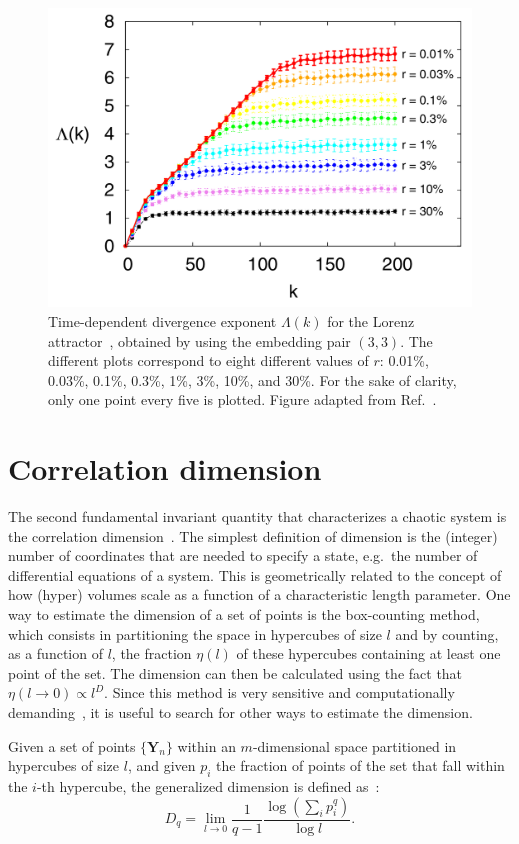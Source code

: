 \begin{figure}[!htbp]
\centering
\includegraphics[width=.6\linewidth]{images/lorenz_divergence.png}
\caption{
    Time-dependent divergence exponent $\Lambda(k)$ for the Lorenz attractor~\cite{lorenz1963deterministic},
    obtained by using the embedding pair
    $(3,3)$. The different plots correspond to eight different values of $r$:
    0.01\%, 0.03\%, 0.1\%, 0.3\%, 1\%, 3\%, 10\%, and 30\%. For the sake of
    clarity, only one point every five is plotted.
    Figure adapted from Ref.~\cite{ref:franchi2014statistical}.
}\label{fig: lorenz divergence}
\end{figure}


\section{Correlation dimension}\label{sec: correlation dimension}

The second fundamental invariant quantity that characterizes a chaotic system is
the correlation dimension~\cite{ref:abarbanel_fourier_spectra}.
The simplest definition of dimension is the (integer) number of coordinates that are
needed to specify a state, e.g.\ the number of differential equations of a system.
This is geometrically related to the concept of how (hyper) volumes scale as a
function of a characteristic length parameter.
One way to estimate the dimension of a set of points is the box-counting method, which consists in partitioning the space in
hypercubes of size $l$ and by counting, as a function of $l$, the fraction $\eta(l)$ of
these hypercubes containing at least one point of the set. The dimension can then be calculated
using the fact that $\eta(l\rightarrow0)\propto l^D$. Since this method is
very sensitive and computationally demanding~\cite{ref:greenside1982impracticality},
it is useful to search for other ways to estimate the dimension.

Given a set of points $\{\mathbf{Y}_n\}$ within an $m$-dimensional space partitioned in hypercubes
of size $l$, and given $p_i$
the fraction of points of the set that fall within the $i$-th hypercube,
the generalized dimension is defined as~\cite{ref:fractal_dim}:
\begin{equation}
    \label{eq: generalized dimension}
    D_q=\lim_{l\rightarrow0}\frac{1}{q-1}\frac{\log(\sum_i p_i^q)}{\log l}.
\end{equation}

